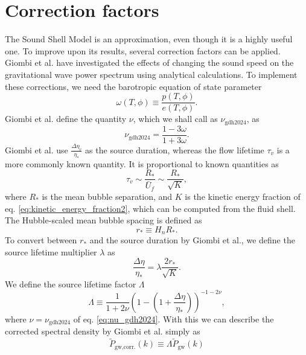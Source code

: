 \section{Correction factors}
\label{correction_factors}
The Sound Shell Model is an approximation, even though it is a highly useful one.
To improve upon its results, several correction factors can be applied.
Giombi et al. have investigated the effects of changing the sound speed on the gravitational wave power spectrum using analytical calculations.
To implement these corrections, we need the barotropic equation of state parameter
\cite[p. 3]{giombi_cs_2024}
\begin{equation}
\omega(T,\phi) \equiv \frac{p(T,\phi)}{e(T,\phi)}.
\end{equation}
Giombi et al. define the quantity $\nu$, which we shall call as $\nu_\text{gdh2024}$, as
\cite[eq. 2.11]{giombi_cs_2024}
\begin{equation}
\nu_\text{gdh2024} = \frac{1 - 3\omega}{1 + 3\omega}.
\label{eq:nu_gdh2024}
\end{equation}
Giombi et al. use $\frac{\Delta \eta_v}{\eta_*}$ as the source duration,
whereas the flow lifetime $\tau_v$ is a more commonly known quantity.
It is proportional to known quantities as
\cites[p. 3]{hindmarsh_gw_pt_2019}[p. 6]{gowling_lisa_2021}
\begin{equation}
\tau_v \sim \frac{R_*}{\bar{U}_f} \sim \frac{R_*}{\sqrt{K}},
\end{equation}
where $R_*$ is the mean bubble separation, and
$K$ is the kinetic energy fraction of eq. \eqref{eq:kinetic_energy_fraction2},
which can be computed from the fluid shell.
The Hubble-scaled mean bubble spacing is defined as
\cite[eq. 2.2]{gowling_lisa_2021}
\begin{equation}
r_* \equiv H_n R_*.
\end{equation}
To convert between $r_*$ and the source duration by Giombi et al.,
we define the source lifetime multiplier $\lambda$ as
\begin{equation}
\frac{\Delta \eta}{\eta_*} = \lambda \frac{2 r_*}{\sqrt{K}}.
\end{equation}
We define the source lifetime factor $\Lambda$
\cite[eq. 3.13]{giombi_cs_2024}
\begin{equation}
\Lambda \equiv \frac{1}{1 + 2\nu} \left(1 - \left(1 + \frac{\Delta \eta}{\eta_*} \right) \right)^{-1-2\nu},
\end{equation}
where $\nu = \nu_\text{gdh2024}$ of eq. \eqref{eq:nu_gdh2024}.
With this we can describe the corrected spectral density by Giombi et al. simply as
\begin{equation}
\tilde{P}_\text{gw,corr.}(k)
\equiv \Lambda \tilde{P}_\text{gw}(k)
\end{equation}

